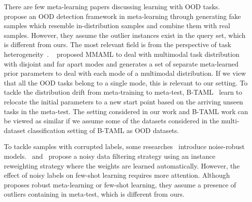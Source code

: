 There are few meta-learning papers discussing learning with OOD tasks. ~\citet{jeong2020ood} propose an OOD detection framework in meta-learning through generating fake samples which resemble in-distribution samples and combine them with real samples. However, they assume the outlier instances exist in the query set, which is different from ours. The most relevant field is from the perspective of task heterogeneity~\citep{vuorio2019multimodal, triantafillou2019meta,yao2020automated}. ~\citet{vuorio2019multimodal} proposed  MMAML to deal with multimodal task distribution with disjoint and far apart modes and generates a set of separate meta-learned prior parameters to deal with each mode of a multimodal distribution. If we view that all the OOD tasks belong to a single mode, this is relevant to our setting. To tackle the distribution drift from meta-training to meta-test, B-TAML~\citep{lee2020l2b} learn to relocate the initial parameters to a new start point based on the arriving unseen tasks in the meta-test. The setting considered in our work and B-TAML work can be viewed as similar if we assume some of the datasets considered in the multi-dataset classification setting of B-TAML as OOD datasets.

To tackle samples with corrupted labels, some researches~\citep{luo2015foveation, jalal2017robust, wang2019direct} introduce noise-robust models.~\citet{ren2018learning} and~\citet{shu2019meta} propose a noisy data filtering strategy using an instance reweighting strategy where the weights are learned automatically. However, the effect of noisy labels on few-shot learning requires more attention. Although ~\citep{yin2018adversarial,lu2020robust,goldblum2020adversarially} proposes robust meta-learning or few-shot learning, they assume a presence of outliers containing in meta-test, which is different from ours. 


